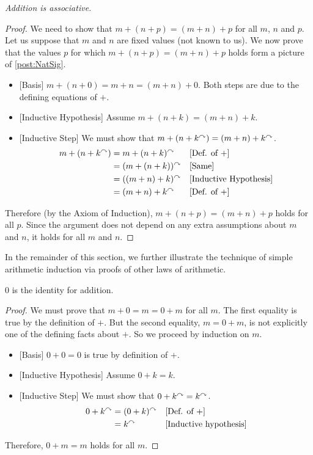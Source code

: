 \begin{prop}

  \emph{Addition is associative.}

\begin{proof}
  We need to show that $m + (n+p) = (m+n)+p$ for all $m$, $n$ and $p$.
  Let us suppose that $m$ and $n$ are fixed values (not known to us).
  We now prove that the values $p$ for which $m+(n+p) = (m+n)+p$ holds
  form a picture of \ref{post:NatSig}.
  \begin{itemize}
  \item{}[Basis] $m+(n+0) = m+n = (m+n)+0$. Both steps are due to the
    defining equations of $+$.
  \item{}[Inductive Hypothesis] Assume $m+(n+k) = (m+n)+k$.
  \item{}[Inductive Step] We must show that $m+(n+k^\curvearrowright) =
    (m+n)+k^\curvearrowright$. 
    \begin{align*}
      m+(n+k^\curvearrowright) &= m + (n+k)^\curvearrowright &&\text{[Def. of +]}\\
      &= (m+(n+k))^\curvearrowright&&\text{[Same]}\\
      &= ((m+n)+k)^\curvearrowright&&\text{[Inductive Hypothesis]}\\
      &= (m+n)+k^\curvearrowright &&\text{[Def. of $+$]}
    \end{align*}
  \end{itemize}
  Therefore (by the Axiom of Induction), $m+(n+p) = (m+n)+p$ holds for
  all $p$. Since the argument does not depend on any extra assumptions
  about $m$ and $n$, it holds for all $m$ and $n$.
\end{proof}
\end{prop}

\printbreak

In the remainder of this section, we further illustrate the technique of simple arithmetic induction via proofs of other laws of arithmetic.

\ipadbreak

\begin{prop}\label{prop:AddZero}
  $0$ is the identity for addition.

\begin{proof}
  We must prove that $m+0 = m = 0 + m$ for all $m$. The first equality is true by the definition of $+$.
  But the second equality, $m = 0 + m$, is not explicitly one of the defining facts about $+$. So we proceed by induction on $m$.
  \begin{itemize}
  \item{}[Basis] $0+0 = 0$ is true by definition of $+$.
  \item{}[Inductive Hypothesis] Assume $0 + k = k$.
  \item{}[Inductive Step] We must show that $0 + k^\curvearrowright = k^\curvearrowright$.
    \begin{align*}
      0 + k^\curvearrowright &= (0+k)^\curvearrowright &&\text{[Def. of $+$]}\\
      &= k^\curvearrowright &&\text{[Inductive hypothesis]}
    \end{align*}
  \end{itemize}
  Therefore, $0+m=m$ holds for all $m$.
\end{proof}
\end{prop}

